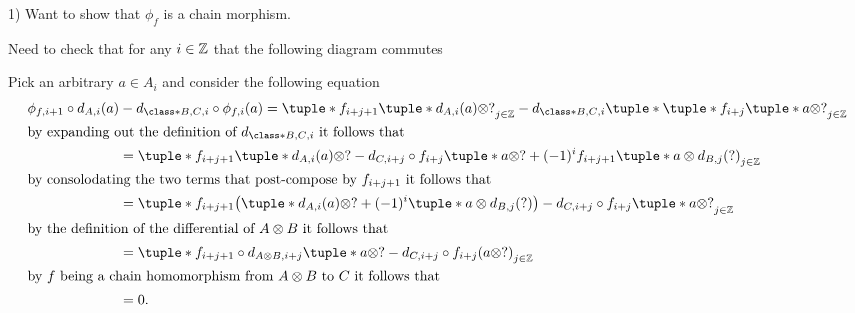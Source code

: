 \begin{remark}
    1) Want to show that \( \phi_f \) is a chain morphism.

    Need to check that for any \( i \in {\mathbb{Z}} \) that the following diagram commutes
    \begin{center}
    \end{center}
    Pick an arbitrary \( a \in A_i \) and consider the following equation
    \begin{align*}
        \phi_{f, i + 1} \circ d_{A, i}(a) &- d_{\class*{B, C}, i} \circ \phi_{f, i}(a)
        = \tuple*{ f_{i + j + 1}\tuple*{d_{A, i}(a) \otimes ?} }_{j \in \Zb}
        - d_{\class*{B, C}, i} \tuple*{ \tuple*{ f_{i + j}\tuple*{a \otimes ?} }_{j \in \Zb} } \\
        \intertext{by expanding out the definition of \( d_{\class*{B, C}, i} \) it follows that}
        &= \tuple*{ f_{i + j + 1}\tuple*{d_{A, i}(a) \otimes ?}
        - d_{C, i + j} \circ f_{i + j}\tuple*{a \otimes ?}
        + (-1)^i f_{i + j + 1}\tuple*{a \otimes d_{B, j}(?)} }_{j \in \Zb} \\
        \intertext{by consolodating the two terms that post-compose by \( f_{i + j + 1} \) it follows that}
        &= \tuple*{ f_{i + j + 1}\bigl( \tuple*{d_{A, i}(a) \otimes ?}
        + (-1)^i\tuple*{ a \otimes d_{B, j}(?) } \bigr)
        - d_{C, i + j} \circ f_{i + j}\tuple*{ a \otimes ? } }_{j \in \Zb} \\
        \intertext{by the definition of the differential of \( A \otimes B \) it follows that}
        &= \tuple*{ f_{i + j + 1} \circ d_{A \otimes B, i + j} \tuple*{ a \otimes ? }
        - d_{C, i + j} \circ f_{i + j} ( a \otimes ? ) }_{j \in \Zb} \\
        \intertext{by \( f \) being a chain homomorphism from \( A \otimes B \) to \( C \) it follows that}
        &= 0.
    \end{align*}
\end{remark}

